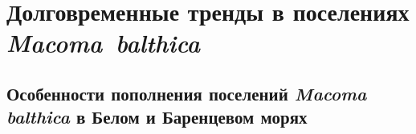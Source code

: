 \afterpage{\clearpage}

\section{Долговременные тренды в поселениях \textit{Macoma~balthica}}




\afterpage{\clearpage}
	\subsection{Особенности пополнения поселений \textit{Macoma balthica} в Белом и Баренцевом морях}


\afterpage{\clearpage}
